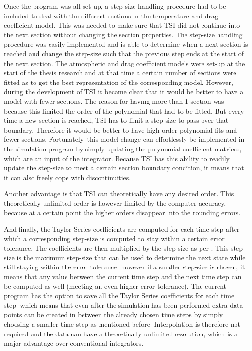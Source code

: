 \noindent
Once the program was all set-up, a step-size handling procedure had to be included to deal with the different sections in the temperature and drag coefficient model. This was needed to make sure that \ac{TSI} did not continue into the next section without changing the section properties. The step-size handling procedure was easily implemented and is able to determine when a next section is reached and change the step-size such that the previous step ends at the start of the next section. The atmospheric and drag coefficient models were set-up at the start of the thesis research and at that time a certain number of sections were fitted as to get the best representation of the corresponding model. However, during the development of \ac{TSI} it became clear that it would be better to have a model with fewer sections. The reason for having more than 1 section was because this limited the order of the polynomial that had to be fitted. But every time a new section is reached, \ac{TSI} has to limit a step-size to pass over that boundary. Therefore it would be better to have high-order polynomial fits and fewer sections. Fortunately, this model change can effortlessly be implemented in the simulation program by simply updating the polynomial coefficient matrices, which are an input of the integrator. 
Because \ac{TSI} has this ability to readily update the step-size to meet a certain section boundary condition, it means that it can also freely cope with discontinuities.  

Another advantage is that \ac{TSI} can theoretically have any desired order. This theoretically unlimited order is however limited by the computer accuracy, because at a certain point the higher orders disappear into the rounding errors.

And finally, the Taylor Series coefficients are computed for each time step after which a corresponding step-size is computed to stay within a certain error tolerance. The coefficients are then multiplied by the step-size as per . This step-size is the maximum step-size that can be used to determine the next state while still staying within the error tolerance, however if a smaller step-size is chosen, it means that any value between the current time step and the next time step can be computed as well (meeting an even higher error tolerance). The current program has the option to save all the Taylor Series coefficients for each time step, which means that even after the simulation has been performed extra data points can be created in between the already chosen time steps by simply choosing a smaller time step as mentioned before. Interpolation is therefore not required and the data can have a theoretically unlimited resolution, which is a major advantage over conventional integrators.



